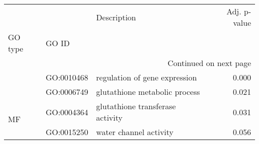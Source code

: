 \begin{longtable}{lllr}
\toprule
   &            &                       Description &  Adj. p-value \\
GO type & GO ID &                                   &               \\
\midrule
\endhead
\midrule
\multicolumn{4}{r}{{Continued on next page}} \\
\midrule
\endfoot

\bottomrule
\endlastfoot
\multirow{2}{*}{BP} & GO:0010468 &     regulation of gene expression &         0.000 \\
   & GO:0006749 &     glutathione metabolic process &         0.021 \\
\cline{1-4}
\multirow{2}{*}{MF} & GO:0004364 &  glutathione transferase activity &         0.031 \\
   & GO:0015250 &            water channel activity &         0.056 \\
\end{longtable}
